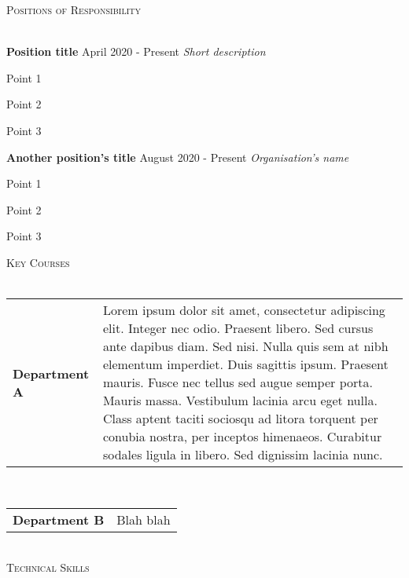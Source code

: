 \documentclass[12pt]{article}   %
\renewcommand{\section}[1]{
    \textsc{#1}
    \vspace*{-10pt} \\ \hspace*{-5pt} 
    \hrulefill \\
    \vspace*{-15pt}
}
\newcommand{\smallbullet}{
    \small$\bullet$
}
\newcommand{\bigblock}[3]{
    {
        \hspace*{5pt} \textbf{#1} \hfill #2 \newline
        \hspace*{5pt} \textit{#3}
    }
}
\newenvironment{bullet-list-minor}{
    \begin{list}{
        \smallbullet
    }{
        \setlength\leftmargin{30pt}\topsep 0pt \itemsep -3pt
    }
} {
    \end{list}
}
\newcommand{\coursesitem}[2]{
    \begin{tabular}{p{4cm}p{14cm}}
        \textbf{#1} &
        #2 \\
    \end{tabular}
    \\
}
\begin{document}

    \section{Positions of Responsibility}

    \bigblock{
        Position title
    }{
        April 2020 - Present
    }{
        Short description
    }
    \begin{bullet-list-minor}
        \item Point 1
        \item Point 2
        \item Point 3
    \end{bullet-list-minor}
    

    \bigblock{
        Another position's title
    }{
        August 2020 - Present
    }{
        Organisation's name
    }
	\begin{bullet-list-minor}
        \item Point 1
        \item Point 2
        \item Point 3
    \end{bullet-list-minor}


    \section{Key Courses}

    \coursesitem{
        Department A
    }{
        Lorem ipsum dolor sit amet, consectetur adipiscing elit. Integer nec odio. Praesent libero.
        Sed cursus ante dapibus diam. Sed nisi. Nulla quis sem at nibh elementum imperdiet. Duis sagittis ipsum.
        Praesent mauris. Fusce nec tellus sed augue semper porta. Mauris massa. Vestibulum lacinia arcu eget nulla.
        Class aptent taciti sociosqu ad litora torquent per conubia nostra, per inceptos himenaeos. Curabitur sodales
        ligula in libero. Sed dignissim lacinia nunc.
    }

    \coursesitem{
        Department B
    }{
        Blah blah
    }


    \section{Technical Skills}
\end{document}
